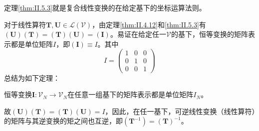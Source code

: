 \documentclass[main.tex]{subfiles}
\begin{document}
定理\ref{thm:II.5.3}就是复合线性变换的在给定基下的坐标运算法则。

对于线性算符$\mathbf{T},\mathbf{U}\in\mathcal{L}\left(\mathcal{V}\right)$，由定理\ref{thm:II.4.12}和\ref{thm:II.5.3}有$\left(\mathbf{U}\right)\left(\mathbf{T}\right)=\left(\mathbf{T}\right)\left(\mathbf{U}\right)=\left(\mathbf{I}\right)$。易证在给定任一$\mathcal{V}$的基下，恒等变换的矩阵表示都是单位矩阵$I$，即$\left(\mathbf{I}\right)\equiv I$。其中
\[I=\begin{pmatrix}1&0&0\\0&1&0\\0&0&1\end{pmatrix}\]
总结为如下定理：

\begin{theorem}
恒等变换$\mathbf{I}:\mathcal{V}_N\rightarrow\mathcal{V}_N$在任意一组基下的矩阵表示都是单位矩阵$I_N$。
\end{theorem}

故$\left(\mathbf{U}\right)\left(\mathbf{T}\right)=\left(\mathbf{T}\right)\left(\mathbf{U}\right)=I$，因此，在任一基下，可逆线性变换（线性算符）的矩阵与其逆变换的矩之间也互逆，即$\left(\mathbf{T}^{-1}\right)=\left(\mathbf{T}\right)^{-1}$。
\end{document}
